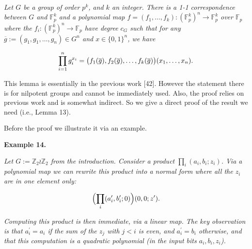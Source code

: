 \emph{Let $G$ be a group of order $p^{k}$,
and $k$ an integer. There is a 1-1 correspondence between $G$ and $\mathbb{F}_{p}^{k}$ and a polynomial map $f=(f_{1},\ldots,f_{k})\colon(\mathbb{F}_{p}^{k})^{n}\to\mathbb{F}_{p}^{k}$
over $\mathbb{F}_{p}$ where the $f_{i}\colon(\mathbb{F}_{p}^{k})^{n}\to\mathbb{F}_{p}$ have degree $c_{G}$
such that for any $\overline{g}:=(g_{1},g_{1},\ldots,g_{n})\in G^{n}$ and $x\in\{0,1\}^{n}$, we have}\par


\[\begin{gathered}
\prod_{i=1}^{n}g_{i}^{x_{i}}=\bigl{(}f_{1}(\overline{g}),f_{2}(\overline{g}),\ldots,f_{k}(\overline{g})\bigr{)}(x_{1},\ldots,x_{n}).
\end{gathered}\]






This lemma is essentially in the previous work [42].
However the statement there is for nilpotent groups and cannot be
immediately used. Also, the proof relies on previous work and is somewhat
indirect. So we give a direct proof of the result we need (i.e., Lemma 13).\par




Before the proof we illustrate it via an example.\par





\par\medskip\noindent\textbf{
\textbf{Example 14}\textbf{.}
}\par



\emph{Let $G:=\mathbb{Z}_{2}\wr\mathbb{Z}_{2}$ from the introduction.
Consider a product $\prod_{i}(a_{i},b_{i};z_{i})$. Via a polynomial map we can rewrite this product into a normal form where all the $z_{i}$ are in one element only:}\par


\[\begin{gathered}
\Bigl{(}\prod_{i}(a^{\prime}_{i},b^{\prime}_{i};0)\Bigr{)}(0,0;z^{\prime}).
\end{gathered}\]


\emph{Computing this product is then immediate, via a linear map. The key observation is that $a^{\prime}_{i}=a_{i}$ if the sum of the $z_{j}$ with $j<i$ is even, and $a^{\prime}_{i}=b_{i}$ otherwise, and that this computation is a quadratic polynomial (in the input bits $a_{i},b_{i},z_{i}$).}\par




